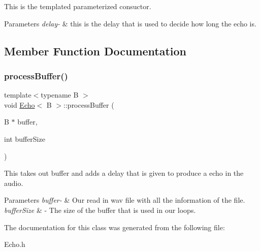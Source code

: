 This is the templated parameterized consuctor. 
\begin{DoxyParams}{Parameters}
{\em delay-\/} & this is the delay that is used to decide how long the echo is. \\
\hline
\end{DoxyParams}


\subsection{Member Function Documentation}
\mbox{\label{classEcho_aed7d72d9f86cd0823dea92d49245ac17}} 
\subsubsection{\texorpdfstring{process\+Buffer()}{processBuffer()}}
{\footnotesize\ttfamily template$<$typename B $>$ \\
void \hyperlink{classEcho}{Echo}$<$ B $>$\+::process\+Buffer (\begin{DoxyParamCaption}\item[{B $\ast$}]{buffer,  }\item[{int}]{buffer\+Size }\end{DoxyParamCaption})}

This takes out buffer and adds a delay that is given to produce a echo in the audio. 
\begin{DoxyParams}{Parameters}
{\em buffer-\/} & Our read in wav file with all the information of the file. \\
\hline
{\em buffer\+Size} & -\/ The size of the buffer that is used in our loops. \\
\hline
\end{DoxyParams}


The documentation for this class was generated from the following file\+:\begin{DoxyCompactItemize}
\item 
Echo.\+h\end{DoxyCompactItemize}
